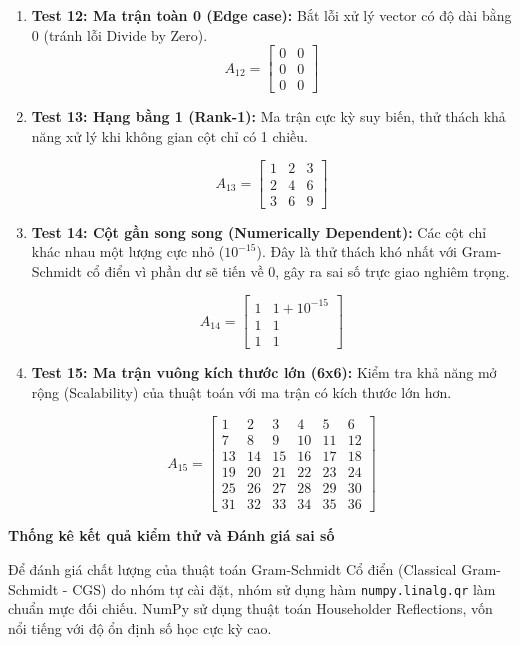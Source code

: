 \begin{enumerate}
    \item \textbf{Test 12: Ma trận toàn 0 (Edge case):} Bắt lỗi xử lý vector có độ dài bằng 0 (tránh lỗi Divide by Zero).
    $$ A_{12} = \begin{bmatrix} 0 & 0 \\ 0 & 0 \\ 0 & 0 \end{bmatrix} $$

    \item \textbf{Test 13: Hạng bằng 1 (Rank-1):}  Ma trận cực kỳ suy biến, thử thách khả năng xử lý khi không gian cột chỉ có 1 chiều.

    $$ A_{13} = \begin{bmatrix} 1 & 2 & 3 \\ 2 & 4 & 6 \\ 3 & 6 & 9 \end{bmatrix} $$

    \item \textbf{Test 14: Cột gần song song (Numerically Dependent):} Các cột chỉ khác nhau một lượng cực nhỏ ($10^{-15}$). Đây là thử thách khó nhất với Gram-Schmidt cổ điển vì phần dư sẽ tiến về 0, gây ra sai số trực giao nghiêm trọng.

    $$ A_{14} = \begin{bmatrix} 1 & 1 + 10^{-15} \\ 1 & 1 \\ 1 & 1 \end{bmatrix} $$

    \item \textbf{Test 15: Ma trận vuông kích thước lớn (6x6):} Kiểm tra khả năng mở rộng (Scalability) của thuật toán với ma trận có kích thước lớn hơn.

    $$ A_{15} = \begin{bmatrix} 1 & 2 & 3 & 4 & 5 & 6 \\ 7 & 8 & 9 & 10 & 11 & 12 \\ 13 & 14 & 15 & 16 & 17 & 18 \\ 19 & 20 & 21 & 22 & 23 & 24 \\ 25 & 26 & 27 & 28 & 29 & 30 \\ 31 & 32 & 33 & 34 & 35 & 36 \end{bmatrix} $$
\end{enumerate}



\textbf{Thống kê kết quả kiểm thử và Đánh giá sai số}


Để đánh giá chất lượng của thuật toán Gram-Schmidt Cổ điển (Classical Gram-Schmidt - CGS) do nhóm tự cài đặt, nhóm sử dụng hàm \texttt{numpy.linalg.qr} làm chuẩn mực đối chiếu. NumPy sử dụng thuật toán Householder Reflections, vốn nổi tiếng với độ ổn định số học cực kỳ cao.

